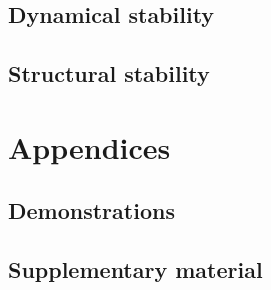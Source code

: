 \documentclass[12pt, titlepage, twoside, openright]{report}
\begin{document}
  \section{Dynamical stability}
  
  \FloatBarrier
  \newpage
  \section{Structural stability}
  


%  
  \chapter{Appendices}
  \section{Demonstrations}
  
  \section{Supplementary material}
  
  \printbibliography
\end{document}
